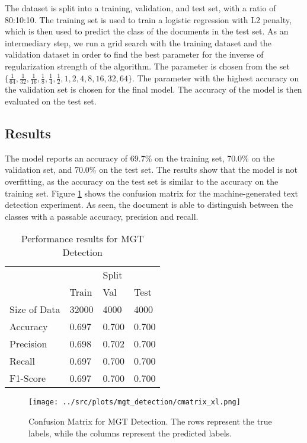 The dataset is split into a training, validation, and test set, with a ratio of 80:10:10. The training set is used to train a logistic regression with L2 penalty, which is then used to predict the class of the documents in the test set. As an intermediary step, we run a grid search with the training dataset and the validation dataset in order to find the best parameter for the inverse of regularization strength of the algorithm. The parameter is chosen from the set $\{\frac{1}{64}, \frac{1}{32}, \frac{1}{16}, \frac{1}{8}, \frac{1}{4}, \frac{1}{2}, 1, 2, 4, 8 , 16, 32 , 64\}$. The parameter with the highest accuracy on the validation set is chosen for the final model. The accuracy of the model is then evaluated on the test set. 

\subsection*{Results}
The model reports an accuracy of 69.7\% on the training set, 70.0\% on the validation set, and 70.0\% on the test set. The results show that the model is not overfitting, as the accuracy on the test set is similar to the accuracy on the training set. Figure \ref{fig:cmatrix_mgt_detection} shows the confusion matrix for the machine-generated text detection experiment. As seen, the document is able to distinguish between the classes with a passable accuracy, precision and recall. 


\begin{table}[htbp]
    \centering
    \caption{Performance results for MGT Detection}
    \label{tab:mgt_detection}
    \begin{tabular}{llll}
    \toprule
     & \multicolumn{3}{c}{Split} \\
     \cline{2-4}
     & Train & Val & Test \\
    \midrule 
    Size of Data & 32000 & 4000 & 4000 \\
    Accuracy & 0.697 & 0.700 & 0.700 \\
    Precision & 0.698 & 0.702 & 0.700 \\
    Recall & 0.697 & 0.700 & 0.700 \\
    F1-Score & 0.697 & 0.700 & 0.700 \\
    \bottomrule
    \end{tabular}
\end{table}

\begin{figure}[htbp]
    \centering
    \texttt{[image: ../src/plots/mgt\_detection/cmatrix\_xl.png]} 
    \caption{Confusion Matrix for MGT Detection. The rows represent the true labels, while the columns represent the predicted labels.}
    \label{fig:cmatrix_mgt_detection}
\end{figure}

